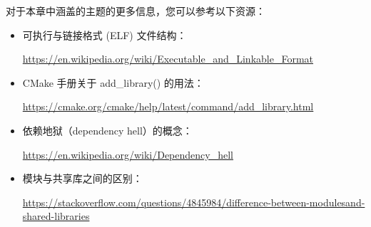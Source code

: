 对于本章中涵盖的主题的更多信息，您可以参考以下资源：

\begin{itemize}
\item
可执行与链接格式 (ELF) 文件结构：

\url{https://en.wikipedia.org/wiki/Executable_and_Linkable_Format}

\item
CMake 手册关于 add\_library() 的用法：

\url{https://cmake.org/cmake/help/latest/command/add_library.html}

\item
依赖地狱（dependency hell）的概念：

\url{https://en.wikipedia.org/wiki/Dependency_hell}

\item
模块与共享库之间的区别：

\url{https://stackoverflow.com/questions/4845984/difference-between-modulesand-shared-libraries}
\end{itemize}